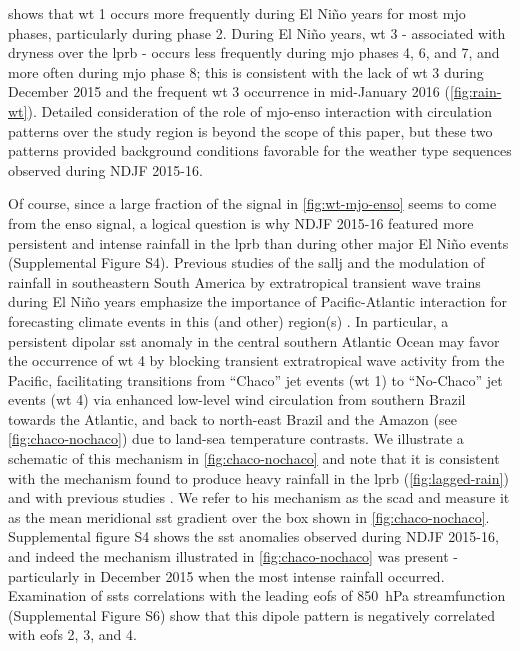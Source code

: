 \documentclass[twocol]{ametsoc}
\begin{document}
 shows that \gls{wt} 1 occurs more frequently during El Ni\~{n}o years for most \gls{mjo} phases, particularly during phase 2.
During El Ni\~no years, \gls{wt} 3 - associated with dryness over the \gls{lprb} - occurs less frequently during \gls{mjo} phases 4, 6, and 7, and more often during \gls{mjo} phase 8; this is consistent with the lack of \gls{wt} 3 during December 2015 and the frequent \gls{wt} 3 occurrence in mid-January 2016 (\cref{fig:rain-wt}).
Detailed consideration of the role of \gls{mjo}-\gls{enso} interaction with circulation patterns over the study region is beyond the scope of this paper, but these two patterns provided background conditions favorable for the weather type sequences observed during NDJF 2015-16.

Of course, since a large fraction of the signal in \cref{fig:wt-mjo-enso} seems to come from the \gls{enso} signal, a logical question is why NDJF 2015-16 featured more persistent and intense rainfall in the \gls{lprb} than during other major El Ni\~no events (Supplemental Figure S4).
Previous studies of the \gls{sallj} \citep[e.g.,][]{Vera2006} and the modulation of rainfall in southeastern South America by extratropical transient wave trains during El Ni\~no years emphasize the importance of Pacific-Atlantic interaction for forecasting climate events in this (and other) region(s) \citep{Barreiro2017}.
In particular, a persistent dipolar \gls{sst} anomaly in the central southern Atlantic Ocean may favor the occurrence of \gls{wt} 4 by blocking transient extratropical wave activity from the Pacific, facilitating transitions from ``Chaco'' jet events (\gls{wt} 1) to ``No-Chaco'' jet events (\gls{wt} 4) via enhanced low-level wind circulation from southern Brazil towards the Atlantic, and back to north-east Brazil and the Amazon (see \cref{fig:chaco-nochaco}) due to land-sea temperature contrasts.
We illustrate a schematic of this mechanism in \cref{fig:chaco-nochaco} and note that it is consistent with the mechanism found to produce heavy rainfall in the \gls{lprb} (\cref{fig:lagged-rain}) and with previous studies \citep[e.g.,][]{Salio2002,Liebmann2004,Vera2006}.
We refer to his mechanism as the \gls{scad} and measure it as the mean meridional \gls{sst} gradient over the box shown in \cref{fig:chaco-nochaco}.
Supplemental figure S4 shows the \gls{sst} anomalies observed during NDJF 2015-16, and indeed the mechanism illustrated in \cref{fig:chaco-nochaco} was present - particularly in December 2015 when the most intense rainfall occurred.
Examination of \glspl{sst} correlations with the leading \glspl{eof} of \SI{850}{\hecto\pascal} streamfunction (Supplemental Figure S6) show that this dipole pattern is negatively correlated with \glspl{eof} 2, 3, and 4.
\end{document}
